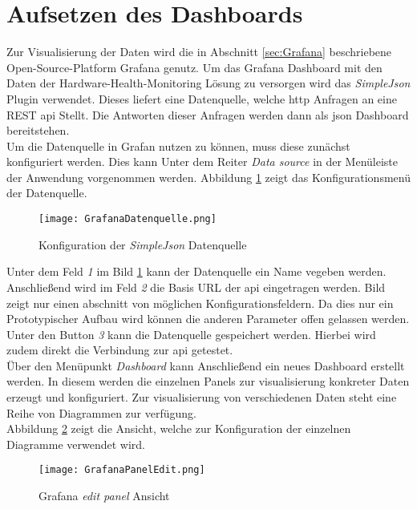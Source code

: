 \newpage
\section{Aufsetzen des Dashboards}\label{sec:AufsetzenDashboard}
Zur Visualisierung der Daten wird die in Abschnitt \ref{sec:Grafana} beschriebene Open-Source-Platform Grafana genutz. Um das Grafana Dashboard mit den Daten der Hardware-Health-Monitoring Lösung zu versorgen wird das \textit{SimpleJson} Plugin verwendet. Dieses liefert eine Datenquelle, welche \ac{http} Anfragen an eine REST \ac{api} Stellt. Die Antworten dieser Anfragen werden dann als \ac{json} Dashboard bereitstehen.\\
Um die Datenquelle in Grafan nutzen zu können, muss diese zunächst konfiguriert werden. Dies kann Unter dem Reiter \textit{Data source} in der Menüleiste der Anwendung vorgenommen werden. Abbildung \ref{fig:SimpleJSONKonfig} zeigt das Konfigurationsmenü der Datenquelle. 
\begin{center}
    \begin{figure}[h!]
        \centering
        \texttt{[image: GrafanaDatenquelle.png]}
        \caption{Konfiguration der \textit{SimpleJson} Datenquelle}
        \label{fig:SimpleJSONKonfig}
    \end{figure}
\end{center}
Unter dem Feld \textit{1} im Bild \ref{fig:SimpleJSONKonfig} kann der Datenquelle ein Name vegeben werden. Anschließend wird im Feld \textit{2} die Basis URL der \ac{api} eingetragen werden. Bild zeigt nur einen abschnitt von möglichen Konfigurationsfeldern. Da dies nur ein Prototypischer Aufbau wird können die anderen Parameter offen gelassen werden. Unter den Button \textit{3} kann die Datenquelle gespeichert werden. Hierbei wird zudem direkt die Verbindung zur \ac{api} getestet.\\
Über den Menüpunkt \textit{Dashboard} kann Anschließend ein neues Dashboard erstellt werden. In diesem werden die einzelnen Panels zur visualisierung konkreter Daten erzeugt und konfiguriert. Zur visualisierung von verschiedenen Daten steht eine Reihe von Diagrammen zur verfügung.\\
Abbildung \ref{fig:PanelBearbeitung} zeigt die Ansicht, welche zur Konfiguration der einzelnen Diagramme verwendet wird.
\begin{center}
    \begin{figure}[h!]
        \centering
        \texttt{[image: GrafanaPanelEdit.png]}
        \caption{Grafana \textit{edit panel} Ansicht}
        \label{fig:PanelBearbeitung}
    \end{figure}
\end{center}
